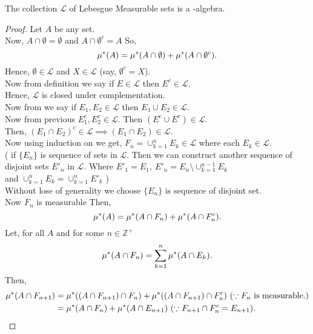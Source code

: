 \begin{theorem}[]
    \label{sigma-algebra}
    The collection $\mathcal{L}$ of Lebesgue Measurable sets is a \sig-algebra.
\end{theorem}
\begin{proof}
    Let $A$ be any set. \\
    Now,  $A\cap\emptyset=\emptyset$ and $A\cap\emptyset^{c}=A$ So,
    \[
        \mu^{*}(A)=\mu^{*}(A\cap\emptyset)+\mu^{*}(A\cap\emptyset^{c}).
    \]
    Hence, $\emptyset\in\mathcal{L}$ and $X\in\mathcal{L}$ (say, $\emptyset^c=X$).\\
    Now from definition we say if $E\in \mathcal{L}$ then  $E^{c}\in\mathcal{L}$.\\
    Hence, $\mathcal{L}$ is closed under complementation.\\
    Now from  we say if  $E_1,E_2\in\mathcal{L}$ then  $E_1\cup E_2\in\mathcal{L}$. \\
    Now from previous $E_1^{c},E_2^{c}\in\mathcal{L}$. Then $(E^{c}\cup E^{c})\in\mathcal{L}$.\\
    Then, $(E_1\cap E_2)^{c}\in\mathcal{L}\implies(E_1\cap E_2)\in\mathcal{L}$.\\
    Now using induction on  we get, $F_n=\cup_{k=1}^{n}E_k\in\mathcal{L}$ where each $E_k\in\mathcal{L}$.\\
    ( 
    if $\{E_n\}$ is sequence of sets in $\mathcal{L}$. Then we can construct another sequence of disjoint sets ${E'_n}$ in  $\mathcal{L}$.
    Where $E'_1=E_1,\ E'_n=E_n\setminus \cup_{k=1}^{n-1}E_k$\\
    and $\cup_{k=1}^{n}E_k=\cup_{k=1}^{n}E'_k$
    )\\
    Without lose of generality we choose $\{E_n\}$ is sequence of disjoint set.\\
    Now $F_n$ is measurable Then,
    \begin{equation}
        \label{Fn measurable}
        \mu^{*}(A)=\mu^{*}(A\cap F_n)+\mu^{*}(A\cap F_n^{c}).
    \end{equation}
    Let, for all $A$ and for some $n\in\mathds{Z}^{+}$ 
    \[
        \mu^{*}(A\cap F_n)=\sum_{k=1}^{n}\mu^{*}(A\cap E_k).
    \]
    Then, 
    \begin{align*}
        \smu(A\cap F_{n+1})&=\smu((A\cap F_{n+1})\cap F_n)+\smu((A\cap F_{n+1})\cap F_n^{c})\ (\because F_n\ \text{is measurable.})\\
                           &=\smu(A\cap F_n)+\smu(A\cap E_{n+1})\ (\because F_{n+1}\cap F_n^{c}=E_{n+1}).\\

\end{align*}
\end{proof}
